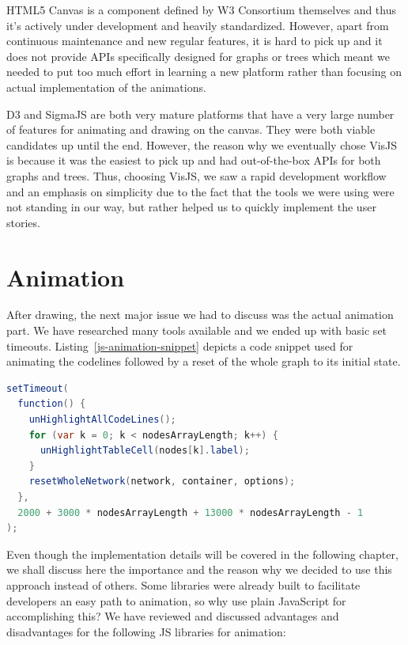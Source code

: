 \documentclass{l4proj}
\begin{document}
HTML5 Canvas is a component defined by W3 Consortium themselves and thus it's actively under development and heavily
standardized. However, apart from continuous maintenance and new regular features, it is hard to pick up and it does
not provide APIs specifically designed for graphs or trees which meant we needed to put too much effort in learning a
new platform rather than focusing on actual implementation of the animations.

D3 and SigmaJS are both very mature platforms that have a very large number of features for animating and drawing on
the canvas. They were both viable candidates up until the end. However, the reason why we eventually chose VisJS
is because it was the easiest to pick up and had out-of-the-box APIs for both graphs and trees. Thus, choosing VisJS, we saw a rapid development workflow and an emphasis on simplicity due to the fact that the tools
we were using were not standing in our way, but rather helped us to quickly implement the user stories.

\section{Animation}

After drawing, the next major issue we had to discuss was the actual animation part. We have researched many tools
available and we ended up with basic set timeouts. Listing~\ref{js-animation-snippet} depicts a code snippet used for
animating the codelines followed by a reset of the whole graph to its initial state.

\begin{lstlisting}[language={Java}, label={js-animation-snippet}, caption={JavaScript snippet for creating an
animation.}]
setTimeout(
  function() {
    unHighlightAllCodeLines();
    for (var k = 0; k < nodesArrayLength; k++) {
      unHighlightTableCell(nodes[k].label);
    }
    resetWholeNetwork(network, container, options);
  },
  2000 + 3000 * nodesArrayLength + 13000 * nodesArrayLength - 1
);
\end{lstlisting}

Even though the implementation details will be covered in the following chapter, we shall discuss here the importance
and the reason why we decided to use this approach instead of others. Some libraries were already built to facilitate developers an easy path to animation, so why use plain JavaScript for
accomplishing this? We have reviewed and discussed advantages and disadvantages for the following JS libraries for animation:
\end{document}
